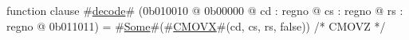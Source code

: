 function clause #\hyperref[zdecode]{decode}# (0b010010 @ 0b00000 @ cd : regno @ cs : regno @ rs : regno @ 0b011011) = #\hyperref[zSome]{Some}#(#\hyperref[zCMOVX]{CMOVX}#(cd, cs, rs, false)) /* CMOVZ */
